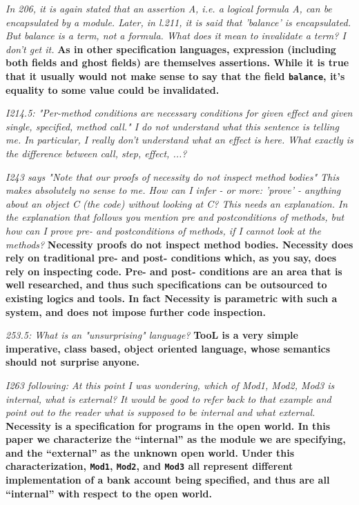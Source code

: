 \documentclass[11pt]{amsart}
\newcommand{\rev}[1]{\emph #1}
\newcommand{\us}[1]{\bf #1}
\begin{document}
 {\rev {{  In 206, it is again stated that an assertion A, i.e. a logical formula A, can be encapsulated by a module. Later, in l.211, it is said that 'balance' is encapsulated. But balance is a term, not a formula. What does it mean to invalidate a term? I don't get it. }}}
 {\us{As in other specification languages, expression (including both fields and ghost fields) are themselves assertions. While it is true that it usually would 
 not make sense to say that the field \texttt{balance}, it's equality to some value could be invalidated.}}

{\rev {{I214.5: "Per-method conditions are necessary conditions for given effect and given single, specified, method call." I do not understand what this sentence is telling me. In particular, I really don't understand what an effect is here. What exactly is the difference between call, step, effect, ...? }}}

{\rev {{I243 says "Note that our proofs of necessity do not inspect method bodies" This makes absolutely no sense to me. How can I infer - or more: 'prove' - anything about an object C (the code) without looking at C? This needs an explanation. In the explanation that follows you mention pre and postconditions of methods, but how can I prove pre- and postconditions of methods, if I cannot look at the methods? }}}
{\us{Necessity proofs do not inspect method bodies. Necessity does rely on traditional pre- and post- conditions which, as you say, does rely on inspecting code. Pre- and post- conditions are an area that is well researched, and thus such specifications can be outsourced to existing logics and tools. In fact Necessity is parametric with such a system, and does not impose further code inspection.}}

{\rev {{253.5: What is an "unsurprising" language?}}}
{\us{TooL is a very simple imperative, class based, object oriented language, whose semantics should not surprise anyone.}}

{\rev {{I263 following: At this point I was wondering, which of Mod1, Mod2, Mod3 is internal, what is external? It would be good to refer back to that example and point out to the reader what is supposed to be internal and what external. }}}
{\us{Necessity is a specification for programs in the open world. In this paper we characterize the ``internal'' as the module we are specifying, and the ``external'' as the unknown open world. 
Under this characterization, \texttt{Mod1}, \texttt{Mod2}, and \texttt{Mod3} all represent different implementation of a bank account being specified, and thus
are all ``internal'' with respect to the open world.}}
\end{document}
